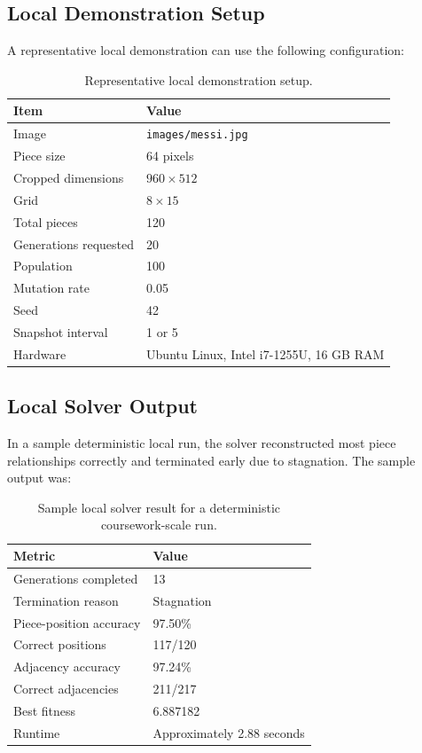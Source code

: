\documentclass[12pt,a4paper]{article}
\begin{document}
\subsection{Local Demonstration Setup}
A representative local demonstration can use the following configuration:
\begin{table}[H]
\centering
\begin{tabular}{ll}
\toprule
\textbf{Item} & \textbf{Value} \\
\midrule
Image & \texttt{images/messi.jpg} \\
Piece size & 64 pixels \\
Cropped dimensions & \(960 \times 512\) \\
Grid & \(8 \times 15\) \\
Total pieces & 120 \\
Generations requested & 20 \\
Population & 100 \\
Mutation rate & 0.05 \\
Seed & 42 \\
Snapshot interval & 1 or 5 \\
Hardware & Ubuntu Linux, Intel i7-1255U, 16 GB RAM \\
\bottomrule
\end{tabular}
\caption{Representative local demonstration setup.}
\end{table}

\subsection{Local Solver Output}
In a sample deterministic local run, the solver reconstructed most piece relationships correctly and terminated early due to stagnation. The sample output was:
\begin{table}[H]
\centering
\begin{tabular}{ll}
\toprule
\textbf{Metric} & \textbf{Value} \\
\midrule
Generations completed & 13 \\
Termination reason & Stagnation \\
Piece-position accuracy & 97.50\% \\
Correct positions & 117/120 \\
Adjacency accuracy & 97.24\% \\
Correct adjacencies & 211/217 \\
Best fitness & 6.887182 \\
Runtime & Approximately 2.88 seconds \\
\bottomrule
\end{tabular}
\caption{Sample local solver result for a deterministic coursework-scale run.}
\end{table}
\end{document}
